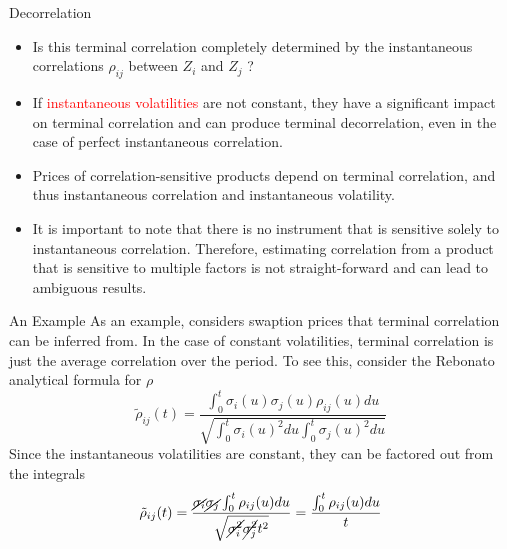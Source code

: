 \documentclass{beamer}
\begin{document}
\begin{frame}{Decorrelation}
  \begin{itemize}
  \item Is this terminal correlation completely determined by the instantaneous correlations $\rho_{ij}$ between $Z_i$ and $Z_j$ ?
  \item If \textcolor{red}{instantaneous volatilities} are not constant, they have a significant impact on terminal correlation and can produce terminal decorrelation, even in the case of perfect instantaneous correlation.
  \item Prices of correlation-sensitive products depend on terminal correlation, and thus instantaneous correlation and instantaneous volatility. 
  \item It is important to note that there is no instrument that is sensitive solely to instantaneous correlation. Therefore, estimating correlation from a product that is sensitive to multiple factors is not straight-forward and can lead to ambiguous results.
  \end{itemize}
\end{frame}

\begin{frame}{An Example}
  As an example, considers swaption prices that terminal correlation can be inferred from.
  In the case of constant volatilities, terminal correlation is just the average correlation over the period. To see this, consider the Rebonato analytical formula for $\rho$
  \begin{equation*}
    \tilde{\rho}_{ij}(t)=\frac{\int_0^t\sigma_i(u)\sigma_j(u)\rho_{ij}(u)du}{\sqrt{\int_0^t\sigma_i(u)^2 du\int_0^t\sigma_j(u)^2 du}}	
  \end{equation*}
  Since the instantaneous volatilities are constant, they can be factored out from the integrals
  \begin{equation*}
    \tilde{\rho}_{ij}(t)=\frac{\cancel{\sigma_i}\cancel{\sigma_j}\int_0^t\rho_{ij}(u)du}{\sqrt{\cancel{\sigma_i^2}\cancel{\sigma_j^2} t^2}}= \frac{\int_0^t\rho_{ij}(u)du}{t}		
  \end{equation*}
\end{frame}
\end{document}
